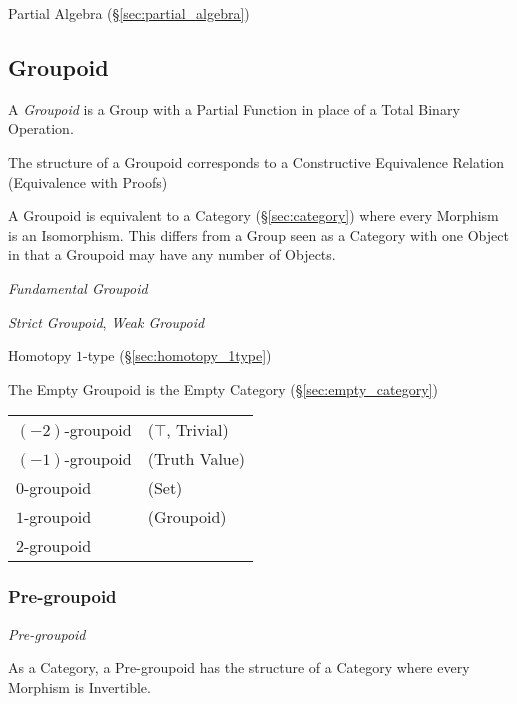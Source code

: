 Partial Algebra (\S\ref{sec:partial_algebra})



\subsection{Groupoid}\label{sec:groupoid}

A \emph{Groupoid} is a Group with a Partial Function in place of a
Total Binary Operation.

The structure of a Groupoid corresponds to a Constructive Equivalence
Relation (Equivalence with Proofs)

A Groupoid is equivalent to a Category (\S\ref{sec:category}) where
every Morphism is an Isomorphism. This differs from a Group seen as a
Category with one Object in that a Groupoid may have any number of
Objects.

\emph{Fundamental Groupoid}

\emph{Strict Groupoid}, \emph{Weak Groupoid}

Homotopy $1$-type (\S\ref{sec:homotopy_1type})

The Empty Groupoid is the Empty Category (\S\ref{sec:empty_category})

\begin{tabular}{l l}
  $(-2)$-groupoid & ($\top$, Trivial) \\

  $(-1)$-groupoid & (Truth Value) \\

  $0$-groupoid    & (Set) \\

  $1$-groupoid    & (Groupoid) \\

  $2$-groupoid    & \\
\end{tabular}



\subsubsection{Pre-groupoid}\label{sec:pre_groupoid}

\emph{Pre-groupoid}

As a Category, a Pre-groupoid has the structure of a Category where
every Morphism is Invertible.



